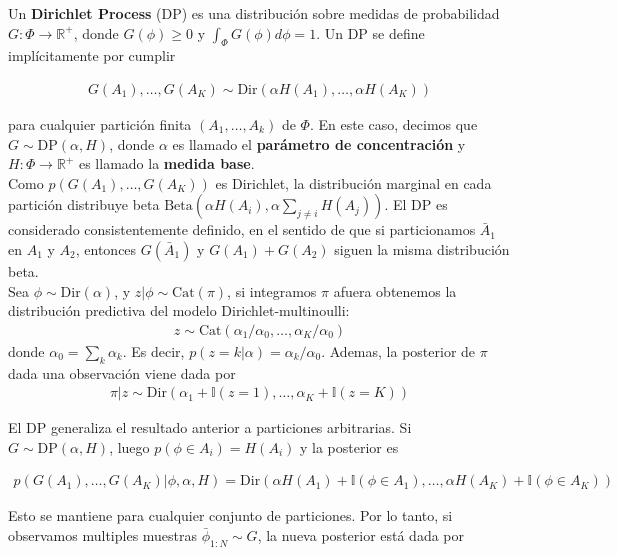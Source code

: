 \documentclass[letterpaper,12pt,oneside]{book} %
\begin{document}
Un \textbf{Dirichlet Process} (DP) es una distribución sobre medidas de probabilidad $G: \Phi \rightarrow \mathbb{R}^{+}$, donde $G(\phi)\geq 0$ y $\int_{\Phi}G(\phi)d\phi=1$. Un DP se define implícitamente por cumplir 

\begin{align}
    G(A_{1}), \ldots, G(A_{K}) \sim \text{Dir}(\alpha H(A_{1}), \ldots, \alpha H(A_{K}))
\end{align}

para cualquier partición finita $(A_{1}, \ldots, A_{k})$ de $\Phi$. En este caso, decimos que $G\sim \text{DP}(\alpha, H)$, donde $\alpha$ es llamado el \textbf{parámetro de concentración} y $H: \Phi \rightarrow \mathbb{R}^{+}$ es llamado la \textbf{medida base}.\\

Como $p(G(A_{1}), \ldots, G(A_{K}))$ es Dirichlet, la distribución marginal en cada partición distribuye beta $\text{Beta}(\alpha H(A_{i}), \alpha \sum_{j\neq i}H(A_{j}))$. El DP es considerado consistentemente definido, en el sentido de que si particionamos $\bar{A}_{1}$ en $A_{1}$ y $A_{2}$, entonces $G(\bar{A}_{1})$ y $G(A_{1})+G(A_{2})$ siguen la misma distribución beta. \\

Sea $\phi \sim \text{Dir}(\alpha)$, y $z|\phi  \sim \text{Cat}(\pi)$, si integramos $\pi$ afuera obtenemos la distribución predictiva del modelo Dirichlet-multinoulli:
\begin{align}
    z\sim \text{Cat}(\alpha_{1}/\alpha_{0}, \ldots, \alpha_{K}/\alpha_{0})
\end{align}
donde $\alpha_{0} = \sum_{k}\alpha_{k}$. Es decir, $p(z=k|\alpha)=\alpha_{k}/\alpha_{0}$. Ademas, la posterior de $\pi$ dada una observación viene dada por
\begin{align}
    \pi|z \sim \text{Dir}(\alpha_{1}+\mathbb{I}(z=1), \ldots, \alpha_{K}+\mathbb{I}(z=K))
\end{align}

El DP generaliza el resultado anterior a particiones arbitrarias. Si $G\sim \text{DP}(\alpha, H)$, luego $p(\phi \in A_{i})=H(A_{i})$ y la posterior es

\begin{align}
    p(G(A_{1}), \ldots, G(A_{K})|\phi, \alpha, H) = \text{Dir}(\alpha H(A_{1})+\mathbb{I}(\phi \in A_{1}), \ldots, \alpha H(A_{K})+\mathbb{I}(\phi \in A_{K}))
\end{align}

Esto se mantiene para cualquier conjunto de particiones. Por lo tanto, si observamos multiples muestras $\bar{\phi}_{1:N}\sim G$, la nueva posterior está dada por 
\end{document}
